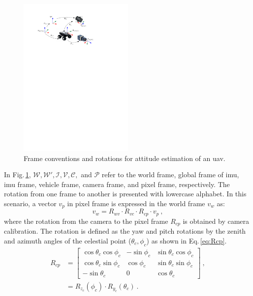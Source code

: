 \begin{figure}[h]
  \centering
  \includegraphics[width=0.5\textwidth]{./content/intro/figures/conventions.pdf}
  \caption{Frame conventions and rotations for attitude estimation of an
    \gls{uav}.}
  \label{fig:rotation}
\end{figure}
In Fig.\,\ref{fig:rotation}, $\mathcal{W}, \mathcal{W'}, \mathcal{I},
\mathcal{V}, \mathcal{C},$ and $\mathcal{P}$ refer to the world frame, global
frame of \gls{imu}, \gls{imu} frame, vehicle frame, camera frame, and pixel
frame, respectively. The rotation from one frame to another is presented
with lowercase alphabet.
In this scenario, a vector $v_{p}$ in pixel frame is expressed in the world
frame $v_{w}$ as:
\begin{equation}
  \label{eq:vinW}
  v_{w} = R_{wv} \cdot R_{vc} \cdot R_{cp} \cdot v_{p} \ ,
\end{equation}
\noindent where the rotation from the camera to the pixel frame $R_{cp}$ is
obtained by camera calibration. The rotation is
defined as the yaw and pitch rotations by the zenith and azimuth angles of the
celestial point ($\theta_c, \phi_c$) as shown in Eq.\,\eqref{eq:Rcp}.
\begin{equation}
  \label{eq:Rcp}
  \begin{split}
  R_{cp}  & =
  \begin{bmatrix}
    \cos\theta_{c}\cos\phi_{c} & -\sin\phi_{c} & \sin\theta_{c}\cos\phi_{c}\\
    \cos\theta_{c}\sin\phi_{c} & \cos\phi_{c} & \sin\theta_{c}\sin\phi_{c}\\
    -\sin\theta_{c} & 0 & \cos\theta_{c}
  \end{bmatrix} \ ,
  \\
  & = R_{z_{c}}(\phi_{c})\cdot R_{y_{c}}(\theta_{c}) \ .
  \end{split}
\end{equation}

